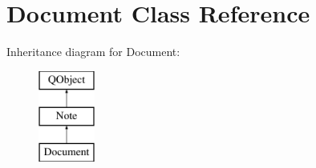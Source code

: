 \hypertarget{class_document}{\section{Document Class Reference}
\label{class_document}
}
Inheritance diagram for Document\-:\begin{figure}[H]
\begin{center}
\leavevmode
\includegraphics[height=3.000000cm]{class_document}
\end{center}
\end{figure}
